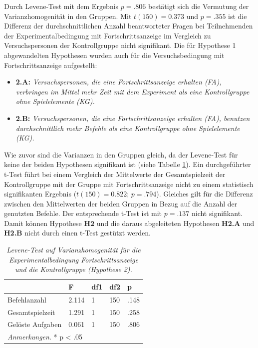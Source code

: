 Durch Levene-Test mit dem Ergebnis $p = .806$ bestätigt sich die Vermutung der Varianzhomogenität in den Gruppen. Mit $t(150) = 0.373$ und $p = .355$ ist die Differenz der durchschnittlichen Anzahl beantworteter Fragen bei Teilnehmenden der Experimentalbedingung mit Fortschrittsanzeige im Vergleich zu Versuchspersonen der Kontrollgruppe nicht signifikant. Die für Hypothese 1 abgewandelten Hypothesen wurden auch für die Versuchsbedingung mit Fortschrittsanzeige aufgestellt: 

\begin{itemize}
    \item \textbf{2.A:} \textit{Versuchspersonen, die eine Fortschrittsanzeige erhalten (FA), verbringen im Mittel mehr Zeit mit dem Experiment als eine Kontrollgruppe ohne Spielelemente (KG).}
    \item \textbf{2.B:} \textit{Versuchspersonen, die eine Fortschrittsanzeige erhalten (FA), benutzen durchschnittlich mehr Befehle als eine Kontrollgruppe ohne Spielelemente (KG).} 
\end{itemize}

 Wie zuvor sind die Varianzen in den Gruppen gleich, da der Levene-Test für keine der beiden Hypothesen signifikant ist (siehe Tabelle \ref{levene_hypo_2}). Ein durchgeführter t-Test führt bei einem Vergleich  der  Mittelwerte  der Gesamtspielzeit der Kontrollgruppe mit der Gruppe mit Fortschrittsanzeige nicht zu einem statistisch signifikanten Ergebnis ($t(150) = 0.822$; $p = .794$). Gleiches gilt für die Differenz zwischen den Mittelwerten der beiden Gruppen in Bezug auf die Anzahl der genutzten Befehle. Der entsprechende t-Test ist mit $p = .137$ nicht signifikant. Damit können Hypothese \textbf{H2} und die daraus abgeleiteten Hypothesen \textbf{H2.A} und \textbf{H2.B} nicht durch einen t-Test gestützt werden.


\begin{table}[htbp]
\centering
\caption{\textit{Levene-Test auf Varianzhomogenität für die Experimentalbedingung Fortschrittsanzeige und die Kontrollgruppe (Hypothese 2).}}
\begin{tabular}{ p{4cm} p{2.0cm} p{2.0cm} p{2.0cm} p{2.0cm} }
 \hline
 & F & df1 &df2 &p \\
 \hline
  Befehlanzahl      & 2.114     & 1 &   150 & .148\\
  Gesamtspielzeit   & 1.291     & 1 &   150 & .258\\
  Gelöste Aufgaben  & 0.061     & 1 &   150 & .806\\
 \hline
  \multicolumn{5}{l}{%
 \small%
\textit{Anmerkungen}. * p < .05
}\\
\end{tabular}
\label{levene_hypo_2}
\end{table}


